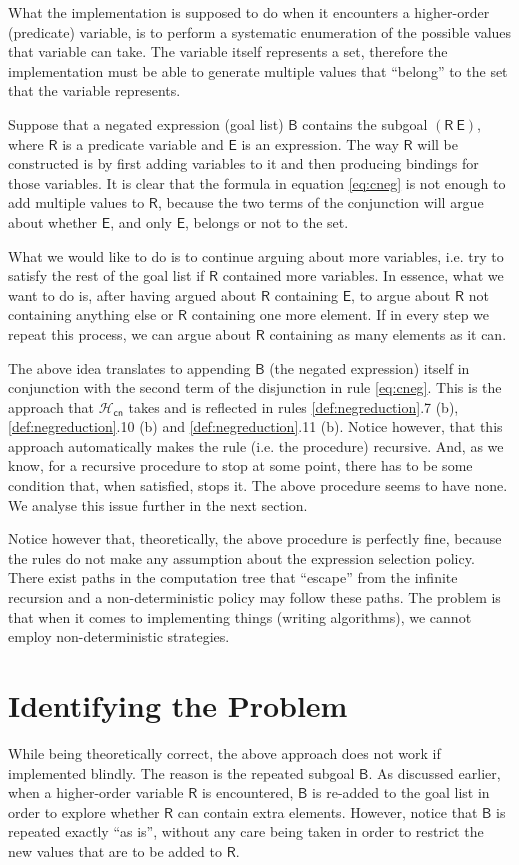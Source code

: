 \documentclass[inscr,ack,preface]{dithesis}
\theoremstyle{definition}
\newcommand{\hcn}{$\mathcal{H}_\mathsf{cn}$}
\newcommand{\msf}[1]{$\mathsf{#1}$}
\begin{document}
What the implementation is supposed to do when it encounters a higher-order (predicate) variable, is to perform a systematic enumeration of the possible values that variable can take. The variable itself represents a set, therefore the implementation must be able to generate multiple values that ``belong'' to the set that the variable represents.

Suppose that a negated expression (goal list) \msf{B} contains the subgoal \msf{(R ~ E)}, where \msf{R} is a predicate variable and \msf{E} is an expression. The way \msf{R} will be constructed is by first adding variables to it and then producing bindings for those variables. It is clear that the formula in equation \ref{eq:cneg} is not enough to add multiple values to \msf{R}, because the two terms of the conjunction will argue about whether \msf{E}, and only \msf{E}, belongs or not to the set.

What we would like to do is to continue arguing about more variables, i.e. try to satisfy the rest of the goal list if \msf{R} contained more variables. In essence, what we want to do is, after having argued about \msf{R} containing \msf{E}, to argue about \msf{R} not containing anything else or \msf{R} containing one more element. If in every step we repeat this process, we can argue about \msf{R} containing as many elements as it can.

The above idea translates to appending \msf{B} (the negated expression) itself in conjunction with the second term of the disjunction in rule \ref{eq:cneg}. This is the approach that \hcn{} takes and is reflected in rules \ref{def:negreduction}.7 (b), \ref{def:negreduction}.10 (b) and \ref{def:negreduction}.11 (b). Notice however, that this approach automatically makes the rule (i.e. the procedure) recursive. And, as we know, for a recursive procedure to stop at some point, there has to be some condition that, when satisfied, stops it. The above procedure seems to have none. We analyse this issue further in the next section.

Notice however that, theoretically, the above procedure is perfectly fine, because the rules do not make any assumption about the expression selection policy. There exist paths in the computation tree that ``escape'' from the infinite recursion and a non-deterministic policy may follow these paths. The problem is that when it comes to implementing things (writing algorithms), we cannot employ non-deterministic strategies.

\section{Identifying the Problem}
While being theoretically correct, the above approach does not work if implemented blindly. The reason is the repeated subgoal \msf{B}. As discussed earlier, when a higher-order variable \msf{R} is encountered, \msf{B} is re-added to the goal list in order to explore whether \msf{R} can contain extra elements. However, notice that \msf{B} is repeated exactly ``as is'', without any care being taken in order to restrict the new values that are to be added to \msf{R}.
\end{document}
